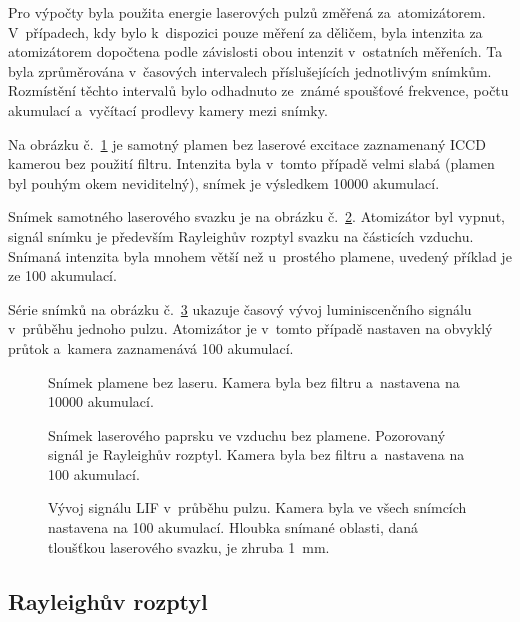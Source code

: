Pro výpočty byla použita energie laserových pulzů změřená za~atomizátorem.
V~případech, kdy bylo k~dispozici pouze měření za děličem,
byla intenzita za atomizátorem dopočtena podle závislosti obou intenzit
v~ostatních měřeních.
Ta byla zprůměrována v~časových intervalech příslušejících jednotlivým snímkům.
Rozmístění těchto intervalů bylo odhadnuto ze~známé spoušťové
frekvence, počtu akumulací a~vyčítací prodlevy kamery mezi sním\-ky.

Na obrázku č.~\ref{fig:lif-flame} je samotný plamen bez laserové excitace
zaznamenaný ICCD kamerou bez použití filtru.
Intenzita byla v~tomto případě velmi slabá
(plamen byl pouhým okem neviditelný),
snímek je výsledkem \num{10000} akumulací.

Snímek samotného laserového svazku je na obrázku č.~\ref{fig:lif-beam}.
Atomizátor byl vypnut, signál snímku je především Rayleighův rozptyl
svazku na částicích vzduchu.
Snímaná intenzita byla mnohem větší než u~prostého plamene,
uvedený příklad je ze \num{100} akumulací.

Série snímků na obrázku č.~\ref{fig:lif-timeev} ukazuje časový vývoj
luminiscenčního signálu v~průběhu jednoho pulzu.
Atomizátor je v~tomto případě nastaven na obvyklý průtok
a~kamera zaznamenává 100 akumulací.

\begin{figure}[p]
	\centering
	
	\caption{Snímek plamene bez laseru.
		Kamera byla bez filtru a~nastavena na \num{10000} akumulací.}
	\label{fig:lif-flame}
\end{figure}
\begin{figure}[p]
	\centering
	
	\caption{Snímek laserového paprsku ve vzduchu bez plamene.
		Pozorovaný signál je Rayleighův rozptyl.
		Kamera byla bez filtru a~nastavena na \num{100} akumulací.}
	\label{fig:lif-beam}
\end{figure}

\begin{figure}[p]
	\centering
	
	\caption{Vývoj signálu LIF v~průběhu pulzu.
		Kamera byla ve všech snímcích nastavena na \num{100} akumulací.
		Hloubka snímané oblasti, daná tloušťkou laserového svazku,
		je zhruba \SI{1}{\milli\metre}.}
	\label{fig:lif-timeev}
\end{figure}

\subsection{Rayleighův rozptyl}
\label{sec:lif-rayleigh}

